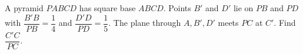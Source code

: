 A pyramid $PABCD$ has square base $ABCD$. Points $B'$ and $D'$ lie on $PB$ and $PD$ with $\dfrac{B'B}{PB}=\dfrac{1}{4}$ and $\dfrac{D'D}{PD}=\dfrac{1}{5}$. The plane through $A,B',D'$ meets $PC$ at $C'$. Find $\dfrac{C'C}{PC}$.
